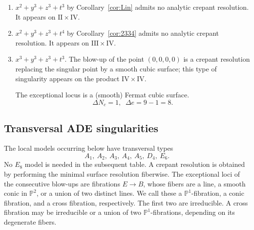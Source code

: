 \documentclass[a4paper]{amsart}
\theoremstyle{plain}
\theoremstyle{definition}
\theoremstyle{remark}
\numberwithin{equation}{section}
\newcommand{\fibericon}[2][]{%
  \tikz[baseline=-0.45ex,scale=0.55,#1]{#2}%
}
\newcommand{\DoublePone}{%
  \fibericon{ \draw[doubleline] (0,-0.5) -- (0,0.5); }%
}
\begin{document}
\begin{enumerate}[itemsep=2mm plus 2mm]
The exceptional loci of all blow-ups are lines: $\DoublePone\quad \DoublePone\quad \DoublePone$ and
\[
\Delta N_{c}=0,\;\; \Delta e=3
\]
\item $x^2 + y^3 + z^3 + t^3$ by Corollary~\ref{cor:Lin} admits no analytic crepant resolution.  It appears on
$\mathrm{II}\times\mathrm{IV}$.

\item $x^2 + y^3 + z^3 + t^4$ by Corollary~\ref{cor:2334} admits no analytic crepant resolution.  It appears on
$\mathrm{III}\times\mathrm{IV}$.

\item $x^3 + y^3 + z^3 + t^3$. The blow-up of the point $(0,0,0,0)$ is a crepant resolution replacing the singular point by a smooth cubic surface; this type of singularity appears on the product $\mathrm{IV}\times \mathrm{IV}$.

The exceptional locus is a (smooth) Fermat cubic surface.
\[
\Delta N_{c}=1,\;\; \Delta e=9-1=8.
\]
\end{enumerate}

\subsection{Transversal ADE singularities}
The local models occurring below have transversal types
\[
A_{1},\ A_{2},\ A_{3},\ A_{4},\ A_{5},\ D_{4},\ E_{6}.
\]
No $E_8$ model is needed in the subsequent table.  A crepant resolution is obtained by
performing the minimal surface resolution fiberwise.  The exceptional loci
of the consecutive blow-ups are fibrations
$E\longrightarrow B$, whose fibers are a line, a smooth conic in
$\mathbb P^{2}$, or a union of two distinct lines.  We call these a
$\mathbb P^{1}$-fibration, a conic fibration, and a cross fibration,
respectively.  The first two are irreducible.  A cross fibration may be
irreducible or a union of two $\mathbb P^{1}$-fibrations, depending on its
degenerate fibers.
\end{document}
